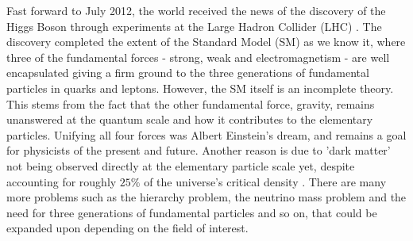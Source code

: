 
Fast forward to July 2012, the world received the news of the discovery of the Higgs Boson through experiments at the Large Hadron Collider (LHC) \cite{chatrchyan2012observation,aad2012observation}. The discovery completed the extent of the Standard Model (SM) as we know it, where three of the fundamental forces - strong, weak and electromagnetism - are well encapsulated giving a firm ground to the three generations of fundamental particles in quarks and leptons. However, the SM itself is an incomplete theory. This stems from the fact that the other fundamental force, gravity, remains unanswered at the quantum scale and how it contributes to the elementary particles. Unifying all four forces was Albert Einstein's dream, and remains a goal for physicists of the present and future. Another reason is due to 'dark matter' not being observed directly at the elementary particle scale yet, despite accounting for roughly $25\% $ of the universe's critical density \cite{bahcall2015dark}. There are many more problems such as the hierarchy problem, the neutrino mass problem and the need for three generations of fundamental particles and so on, that could be expanded upon depending on the field of interest. \par


